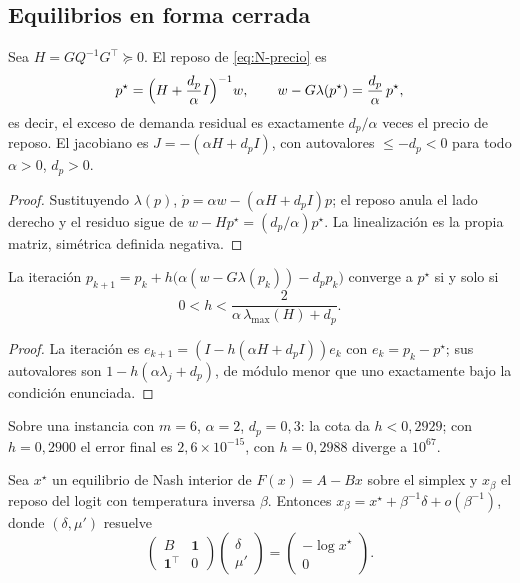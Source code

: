 \subsection{Equilibrios en forma cerrada}

\begin{teorema}
\label{th:N-precios}
Sea $H=GQ^{-1}G^{\!\top}\succeq0$. El reposo de \eqref{eq:N-precio} es
\[
  p^\star=\Bigl(H+\frac{d_p}{\alpha}I\Bigr)^{-1}w,
  \qquad
  w-G\lambda(p^\star)=\frac{d_p}{\alpha}\,p^\star,
\]
es decir, el exceso de demanda residual es exactamente $d_p/\alpha$ veces el
precio de reposo. El jacobiano es $J=-(\alpha H+d_pI)$, con autovalores
$\le-d_p<0$ para todo $\alpha>0$, $d_p>0$.
\end{teorema}

\begin{proof}
Sustituyendo $\lambda(p)$, $\dot p=\alpha w-(\alpha H+d_pI)p$; el reposo anula el
lado derecho y el residuo sigue de $w-Hp^\star=(d_p/\alpha)p^\star$. La
linealización es la propia matriz, simétrica definida negativa.
\end{proof}

\begin{teorema}
\label{th:N-ventana}
La iteración $p_{k+1}=p_k+h\bigl(\alpha(w-G\lambda(p_k))-d_pp_k\bigr)$ converge a
$p^\star$ si y solo si
\[
  0<h<\frac{2}{\alpha\,\lambda_{\max}(H)+d_p}.
\]
\end{teorema}

\begin{proof}
La iteración es $e_{k+1}=(I-h(\alpha H+d_pI))e_k$ con $e_k=p_k-p^\star$; sus
autovalores son $1-h(\alpha\lambda_j+d_p)$, de módulo menor que uno exactamente
bajo la condición enunciada.
\end{proof}

Sobre una instancia con $m=6$, $\alpha=2$, $d_p=0{,}3$: la cota da
$h<0{,}2929$; con $h=0{,}2900$ el error final es $2{,}6\times10^{-15}$, con
$h=0{,}2988$ diverge a $10^{67}$.

\begin{teorema}
\label{th:N-logit}
Sea $x^\star$ un equilibrio de Nash interior de $F(x)=A-Bx$ sobre el simplex y
$x_\beta$ el reposo del logit con temperatura inversa $\beta$. Entonces
$x_\beta=x^\star+\beta^{-1}\delta+o(\beta^{-1})$, donde $(\delta,\mu')$ resuelve
\[
  \begin{pmatrix}B&\mathbf 1\\ \mathbf 1^{\!\top}&0\end{pmatrix}
  \begin{pmatrix}\delta\\ \mu'\end{pmatrix}
  =\begin{pmatrix}-\log x^\star\\ 0\end{pmatrix}.
\]
\end{teorema}

